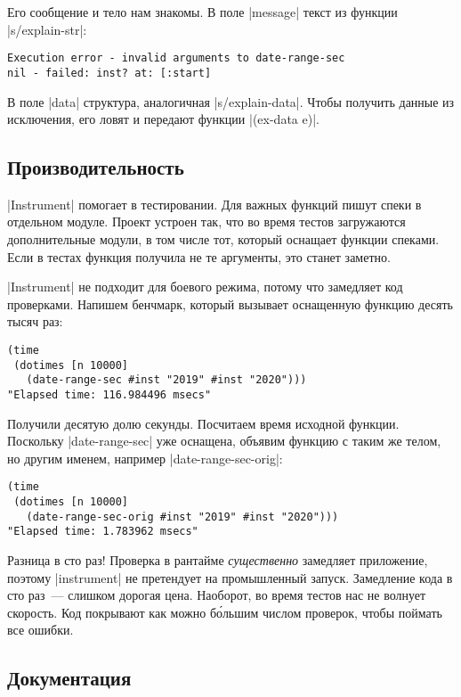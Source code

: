 Его сообщение и тело нам знакомы. В поле \spverb|message| текст из функции
\spverb|s/explain-str|:

\begin{verbatim}
Execution error - invalid arguments to date-range-sec
nil - failed: inst? at: [:start]
\end{verbatim}

В поле \spverb|data| структура, аналогичная \spverb|s/explain-data|. Чтобы
получить данные из исключения, его ловят и передают функции \spverb|(ex-data e)|.

\subsection{Производительность}

\spverb|Instrument| помогает в тестировании. Для важных функций пишут спеки в
отдельном модуле. Проект устроен так, что во время тестов загружаются
дополнительные модули, в том числе тот, который оснащает функции спеками. Если в
тестах функция получила не те аргументы, это станет заметно.

\spverb|Instrument| не подходит для боевого режима, потому что замедляет код
проверками. Напишем бенчмарк, который вызывает оснащенную функцию десять тысяч
раз:

\begin{verbatim}
(time
 (dotimes [n 10000]
   (date-range-sec #inst "2019" #inst "2020")))
"Elapsed time: 116.984496 msecs"
\end{verbatim}

Получили десятую долю секунды. Посчитаем время исходной функции. Поскольку
\spverb|date-range-sec| уже оснащена, объявим функцию с таким же телом, но
другим именем, например \spverb|date-range-sec-orig|:

\begin{verbatim}
(time
 (dotimes [n 10000]
   (date-range-sec-orig #inst "2019" #inst "2020")))
"Elapsed time: 1.783962 msecs"
\end{verbatim}

Разница в сто раз! Проверка в рантайме \emph{существенно} замедляет приложение,
поэтому \spverb|instrument| не претендует на промышленный запуск. Замедление
кода в сто раз~--- слишком дорогая цена. Наоборот, во время тестов нас не
волнует скорость. Код покрывают как можно б\'{о}льшим числом проверок, чтобы
поймать все ошибки.

\subsection{Документация}

